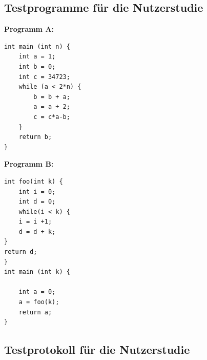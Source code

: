\documentclass[parskip=full]{scrartcl}
\begin{document}
\subsection{Testprogramme für die Nutzerstudie}\label{code}
\textbf{Programm A:}
\begin{verbatim}
int main (int n) {
	int a = 1;
	int b = 0;
	int c = 34723;
	while (a < 2*n) {
		b = b + a;
		a = a + 2;
		c = c*a-b;
	}
	return b;
}
\end{verbatim}

\textbf{Programm B:}
\begin{verbatim}
int foo(int k) {
	int i = 0;
	int d = 0;
	while(i < k) {
	i = i +1;
	d = d + k;
}
return d;
}
int main (int k) {

	int a = 0;
	a = foo(k);
	return a;
}
\end{verbatim}

\subsection{Testprotokoll für die Nutzerstudie}\label{usertest}


\end{document}
